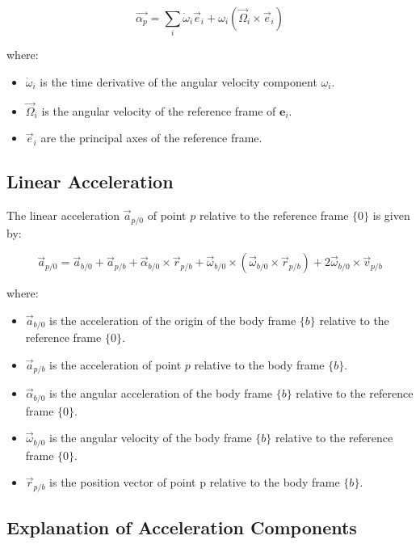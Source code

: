 \[
\vec{\alpha_{p}} = \sum_{i} \dot{\omega}_i \vec{e}_i + \omega_i (\vec{\Omega}_i \times \vec{e}_i)
\]

where:
\begin{itemize}
    \item \( \dot{\omega}_i \) is the time derivative of the angular velocity component \( \omega_i \).
    \item \( \vec{\Omega}_i \) is the angular velocity of the reference frame of \( \mathbf{e}_i \).
    \item \( \vec{e}_i \) are the principal axes of the reference frame.
\end{itemize}

\subsection{Linear Acceleration}

The linear acceleration \( \vec{a}_{p/0} \) of point \( p \) relative to the reference frame \( \{0\} \) is given by:

\[
\vec{a}_{p/0} = \vec{a}_{b/0} + \vec{a}_{p/b} + \vec{\alpha}_{b/0} \times \vec{r}_{p/b} + \vec{\omega}_{b/0} \times (\vec{\omega}_{b/0} \times \vec{r}_{p/b}) + 2 \vec{\omega}_{b/0} \times \vec{v}_{p/b}
\]

where:
\begin{itemize}
    \item \( \vec{a}_{b/0} \) is the acceleration of the origin of the body frame \( \{b\} \) relative to the reference frame \( \{0\} \).
    \item \( \vec{a}_{p/b} \) is the acceleration of point \( p \) relative to the body frame \( \{b\} \).
    \item \( \vec{\alpha}_{b/0} \) is the angular acceleration of the body frame \( \{b\} \) relative to the reference frame \( \{0\} \).
    \item \( \vec{\omega}_{b/0} \) is the angular velocity of the body frame \( \{b\} \) relative to the reference frame \( \{0\} \).
    \item \( \vec{r}_{p/b} \) is the position vector of point p relative to the body frame \( \{b\} \).
\end{itemize}

\subsection{Explanation of Acceleration Components}

